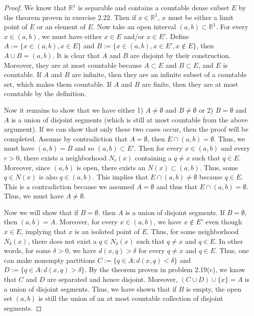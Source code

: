 \documentclass[psamsfonts]{amsart}
\theoremstyle{definition}
\theoremstyle{remark}
\numberwithin{equation}{section}
\begin{document}
\begin{proof}
We know that $\mathbb{R}^1$ is separable and contains a countable dense subset $E$ by the theorem proven in exercise $2.22$. Then if $x \in \mathbb{R}^1$, $x$ must be either a limit point of $E$ or an element of $E$. Now take an open interval $(a,b) \subset \mathbb{R}^1$. For every $x \in (a,b)$, we must have either $x \in E$ and/or $x \in E'$. Define $A := \{x \in (a,b), x\in E \}$ and $B := \{ x \in (a,b), x \in E', x \notin E \}$, then $A \cup B = (a,b)$. It is clear that $A$ and $B$ are disjoint by their construction. Moreover, they are at most countable because $A \subset E$ and $B \subset E$, and $E$ is countable. If $A$ and $B$ are infinite, then they are an infinite subset of a countable set, which makes them countable. If $A$ and $B$ are finite, then they are at most countable by the definition.

Now it remains to show that we have either 1) $A \neq \emptyset$ and $B \neq \emptyset$ or 2) $B = \emptyset$ and $A$ is a union of disjoint segments (which is still at most countable from the above argument). If we can show that only these two cases occur, then the proof will be completed. Assume by contradiction that $A = \emptyset$, then $E \cap (a,b) = \emptyset$. Thus, we must have $(a,b) = B$ and so $(a,b) \subset E'$. Then for every $x \in (a,b)$ and every $r>0$, there exists a neighborhood $N_r(x)$ containing a $q \neq x$ such that $q  \in E$. Moreover, since $(a,b)$ is open, there exists an $N(x) \subset (a,b)$. Thus, some $q \in N(x)$ is also $q \in (a,b)$. This implies that $E \cap (a,b) \neq \emptyset$ because $q \in E$. This is a contradiction because we assumed $A = \emptyset$ and thus that $E \cap (a,b) = \emptyset$. Thus, we must have $A \neq \emptyset$.

Now we will show that if $B = \emptyset$, then $A$ is a union of disjoint segments. If $B = \emptyset$, then $(a,b) = A$. Moreover, for every $x \in (a,b)$, we have $x \notin E'$ even though $x \in E$, implying that $x$ is an isolated point of $E$. Thus, for some neighborhood $N_\delta(x)$, there does not exist a $q \in N_\delta(x)$ such that $q \neq x$ and $q \in E$. In other words, for some $\delta > 0$, we have $d(x,q) > \delta$ for every $q \neq x$ and $q \in E$. Thus, one can make nonempty partitions $C := \{ q \in A: d(x,q) < \delta \}$ and $D := \{ q \in A: d(x,q) > \delta \}$. By the theorem proven in problem 2.19(c), we know that $C$ and $D$ are separated and hence disjoint. Moreover, $(C \cup D) \cup \{x\} = A$ is a union of disjoint segments. Thus, we have shown that if $B$ is empty, the open set $(a,b)$ is still the union of an at most countable collection of disjoint segments.
\end{proof}
\end{document}
